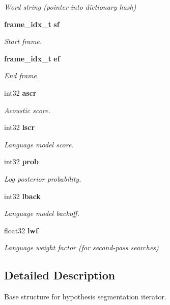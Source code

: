 \begin{DoxyCompactItemize}
\begin{DoxyCompactList}\small\item\em Word string (pointer into dictionary hash) \end{DoxyCompactList}\item 
{\bf frame\-\_\-idx\-\_\-t} {\bf sf}
\begin{DoxyCompactList}\small\item\em Start frame. \end{DoxyCompactList}\item 
{\bf frame\-\_\-idx\-\_\-t} {\bf ef}
\begin{DoxyCompactList}\small\item\em End frame. \end{DoxyCompactList}\item 
int32 {\bf ascr}
\begin{DoxyCompactList}\small\item\em Acoustic score. \end{DoxyCompactList}\item 
int32 {\bf lscr}
\begin{DoxyCompactList}\small\item\em Language model score. \end{DoxyCompactList}\item 
int32 {\bf prob}
\begin{DoxyCompactList}\small\item\em Log posterior probability. \end{DoxyCompactList}\item 
int32 {\bf lback}
\begin{DoxyCompactList}\small\item\em Language model backoff. \end{DoxyCompactList}\item 
float32 {\bf lwf}\label{structps__seg__s_a2249c012b83c902f4f8ed8d98ded7d20}

\begin{DoxyCompactList}\small\item\em Language weight factor (for second-\/pass searches) \end{DoxyCompactList}\end{DoxyCompactItemize}


\subsection{Detailed Description}
Base structure for hypothesis segmentation iterator. 

